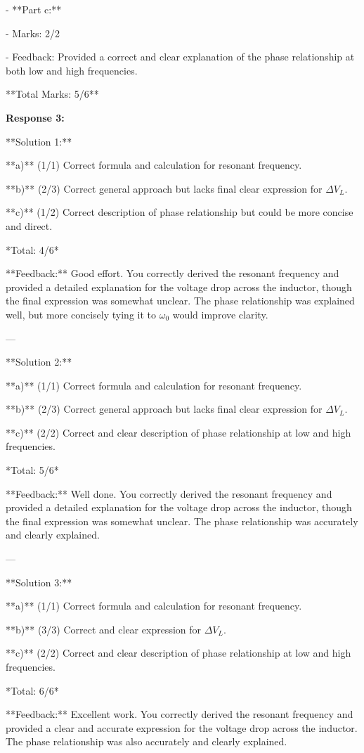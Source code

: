 \documentclass[a4paper,11pt]{article}
\begin{document}
- **Part c:**

  - Marks: 2/2
  
  - Feedback: Provided a correct and clear explanation of the phase relationship at both low and high frequencies.

**Total Marks: 5/6**

\bigskip
\textbf{Response 3:}

**Solution 1:**

**a)** (1/1) Correct formula and calculation for resonant frequency.

**b)** (2/3) Correct general approach but lacks final clear expression for \( \Delta V_L \).

**c)** (1/2) Correct description of phase relationship but could be more concise and direct.

*Total: 4/6*

**Feedback:** Good effort. You correctly derived the resonant frequency and provided a detailed explanation for the voltage drop across the inductor, though the final expression was somewhat unclear. The phase relationship was explained well, but more concisely tying it to \(\omega_0\) would improve clarity.

---

**Solution 2:**

**a)** (1/1) Correct formula and calculation for resonant frequency.

**b)** (2/3) Correct general approach but lacks final clear expression for \( \Delta V_L \).

**c)** (2/2) Correct and clear description of phase relationship at low and high frequencies.

*Total: 5/6*

**Feedback:** Well done. You correctly derived the resonant frequency and provided a detailed explanation for the voltage drop across the inductor, though the final expression was somewhat unclear. The phase relationship was accurately and clearly explained.

---

**Solution 3:**

**a)** (1/1) Correct formula and calculation for resonant frequency.

**b)** (3/3) Correct and clear expression for \( \Delta V_L \).

**c)** (2/2) Correct and clear description of phase relationship at low and high frequencies.

*Total: 6/6*

**Feedback:** Excellent work. You correctly derived the resonant frequency and provided a clear and accurate expression for the voltage drop across the inductor. The phase relationship was also accurately and clearly explained.
\end{document}
